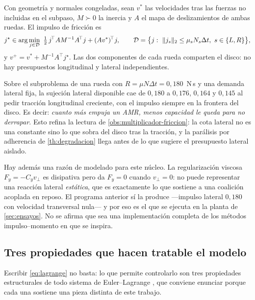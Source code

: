 \begin{proposicion}
\label{pr:disco-friccion}
Con geometría y normales congeladas, sean $v^{*}$ las velocidades tras las fuerzas
no incluidas en el subpaso, $M\succ0$ la inercia y $A$ el mapa de deslizamientos
de ambas ruedas. El impulso de fricción es
\[
  j^\star\in\arg\min_{j\in\Dcal}\ \tfrac12\,j^{\!\top}AM^{-1}A^{\!\top}j+(Av^{*})^{\!\top}j,
  \qquad
  \Dcal=\bigl\{j:\ \lVert j_s\rVert_2\le\mu_sN_s\Delta t,\ s\in\{L,R\}\bigr\},
\]
y $v^{+}=v^{*}+M^{-1}A^{\!\top}j^\star$. Las dos componentes de cada rueda comparten
el disco: no hay presupuestos longitudinal y lateral independientes.
\end{proposicion}

\begin{observacion}
\label{obs:disco-compartido}
Sobre el subproblema de una rueda con $R=\mu N\Delta t=0{,}180$~N\,s y una demanda
lateral fija, la sujeción lateral disponible cae de $0{,}180$ a $0{,}176$,
$0{,}164$ y $0{,}145$ al pedir tracción longitudinal creciente, con el impulso
siempre en la frontera del disco. Es decir: \emph{cuanto más empuja un AMR, menos
capacidad le queda para no derrapar}. Esto refina la lectura de
\cref{obs:multiplicador-friccion}: la cota lateral no es una constante sino lo
que sobra del disco tras la tracción, y la parálisis por adherencia de
\cref{th:degradacion} llega antes de lo que sugiere el presupuesto lateral aislado.

Hay además una razón de modelado para este núcleo. La regularización viscosa
$F_y=-C_y v_\perp$ es disipativa pero da $F_y=0$ cuando $v_\perp=0$: no puede
representar una reacción lateral \emph{estática}, que es exactamente lo que
sostiene a una coalición acoplada en reposo. El programa anterior sí la produce
—impulso lateral $0{,}180$ con velocidad transversal nula— y por eso es el que
se ejecuta en la planta de \cref{sec:ensayos}. No se afirma que sea una
implementación completa de los métodos impulso–momento en que se inspira.
\end{observacion}

\figDisco

\subsection{Tres propiedades que hacen tratable el modelo}

Escribir \eqref{eq:lagrange} no basta: lo que permite controlarlo son tres
propiedades estructurales de todo sistema de Euler--Lagrange
\cite{cai2022cooperative}, que conviene enunciar porque cada una sostiene una
pieza distinta de este trabajo.

